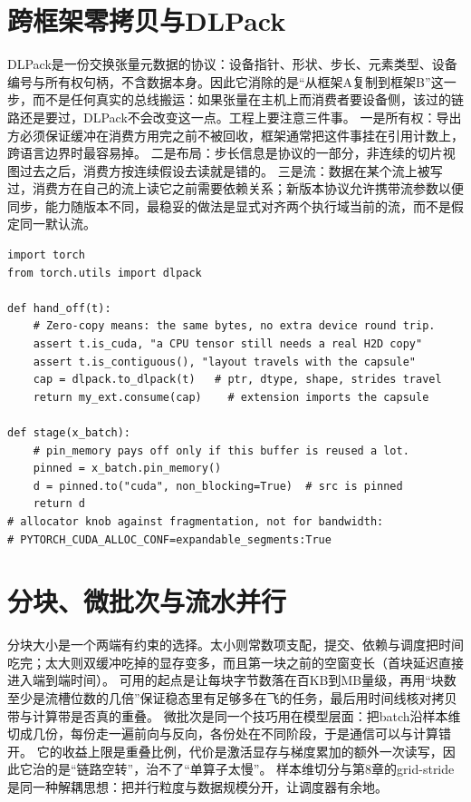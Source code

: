 \documentclass[12pt,a4paper,fontset=fandol]{ctexbook}
\begin{document}
\section{跨框架零拷贝与DLPack}

DLPack是一份交换张量元数据的协议：设备指针、形状、步长、元素类型、设备编号与所有权句柄，不含数据本身。因此它消除的是``从框架A复制到框架B''这一步，而不是任何真实的总线搬运：如果张量在主机上而消费者要设备侧，该过的链路还是要过，DLPack不会改变这一点。工程上要注意三件事。
一是所有权：导出方必须保证缓冲在消费方用完之前不被回收，框架通常把这件事挂在引用计数上，跨语言边界时最容易掉。
二是布局：步长信息是协议的一部分，非连续的切片视图过去之后，消费方按连续假设去读就是错的。
三是流：数据在某个流上被写过，消费方在自己的流上读它之前需要依赖关系；新版本协议允许携带流参数以便同步，能力随版本不同，最稳妥的做法是显式对齐两个执行域当前的流，而不是假定同一默认流。

\begin{lstlisting}[style=pythonstyle,caption={DLPack交接与pinned、非阻塞拷贝的要点}]
import torch
from torch.utils import dlpack

def hand_off(t):
    # Zero-copy means: the same bytes, no extra device round trip.
    assert t.is_cuda, "a CPU tensor still needs a real H2D copy"
    assert t.is_contiguous(), "layout travels with the capsule"
    cap = dlpack.to_dlpack(t)   # ptr, dtype, shape, strides travel
    return my_ext.consume(cap)    # extension imports the capsule

def stage(x_batch):
    # pin_memory pays off only if this buffer is reused a lot.
    pinned = x_batch.pin_memory()
    d = pinned.to("cuda", non_blocking=True)  # src is pinned
    return d
# allocator knob against fragmentation, not for bandwidth:
# PYTORCH_CUDA_ALLOC_CONF=expandable_segments:True
\end{lstlisting}

\section{分块、微批次与流水并行}

分块大小是一个两端有约束的选择。太小则常数项支配，提交、依赖与调度把时间吃完；太大则双缓冲吃掉的显存变多，而且第一块之前的空窗变长（首块延迟直接进入端到端时间）。
可用的起点是让每块字节数落在百KB到MB量级，再用``块数至少是流槽位数的几倍''保证稳态里有足够多在飞的任务，最后用时间线核对拷贝带与计算带是否真的重叠。
微批次是同一个技巧用在模型层面：把batch沿样本维切成几份，每份走一遍前向与反向，各份处在不同阶段，于是通信可以与计算错开。
它的收益上限是重叠比例，代价是激活显存与梯度累加的额外一次读写，因此它治的是``链路空转''，治不了``单算子太慢''。
样本维切分与第8章的grid-stride是同一种解耦思想：把并行粒度与数据规模分开，让调度器有余地。
\end{document}

